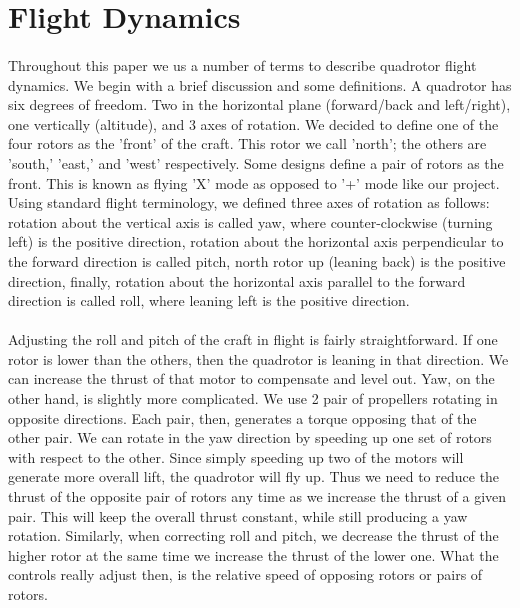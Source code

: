 \section{Flight Dynamics}
\paragraph{}
Throughout this paper we us a number of terms to describe quadrotor flight dynamics.  We begin with a brief discussion and some definitions.  A quadrotor has six degrees of freedom.  Two in the horizontal plane (forward/back and left/right), one vertically (altitude), and 3 axes of rotation.  We decided to define one of the four rotors as the 'front' of the craft.  This rotor we call 'north'; the others are 'south,' 'east,' and 'west' respectively.  Some designs define a pair of rotors as the front.  This is known as flying 'X' mode as opposed to '+' mode like our project.  Using standard flight terminology, we defined three axes of rotation as follows: rotation about the vertical axis is called yaw, where counter-clockwise (turning left) is the positive direction, rotation about the horizontal axis perpendicular to the forward direction is called pitch, north rotor up (leaning back) is the positive direction, finally, rotation about the horizontal axis parallel to the forward direction is called roll, where leaning left is the positive direction.
\paragraph{}
Adjusting the roll and pitch of the craft in flight is fairly straightforward.  If one rotor is lower than the others, then the quadrotor is leaning in that direction.  We can increase the thrust of that motor to compensate and level out.  Yaw, on the other hand, is slightly more complicated.  We use 2 pair of propellers rotating in opposite directions.  Each pair, then, generates a torque opposing that of the other pair.  We can rotate in the yaw direction by speeding up one set of rotors with respect to the other.  Since simply speeding up two of the motors will generate more overall lift, the quadrotor will fly up.  Thus we need to reduce the thrust of the opposite pair of rotors any time as we increase the thrust of a given pair.  This will keep the overall thrust constant, while still producing a yaw rotation.  Similarly, when correcting roll and pitch, we decrease the thrust of the higher rotor at the same time we increase the thrust of the lower one.  What the controls really adjust then, is the relative speed of opposing rotors or pairs of rotors.

